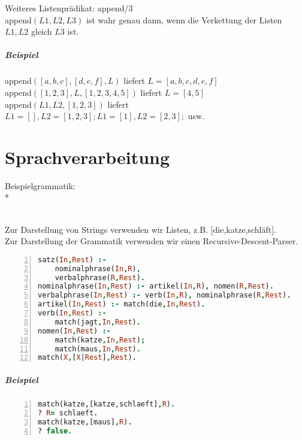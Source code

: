 \documentclass[a4paper]{scrartcl}
\begin{document}
Weiteres Listenprädikat: append$/$3\\
append$(L1,L2,L3)$ ist wahr genau dann, wenn die Verkettung der Listen $L1,L2$ gleich $L3$ ist.
\subparagraph{Beispiel} append$([a,b,c],[d,e,f],L)$ liefert $L=[a,b,c,d,e,f]$\\
append$([1,2,3],L,[1,2,3,4,5])$ liefert $L=[4,5]$\\
append$(L1,L2,[1,2,3])$ liefert $L1 = [], L2=[1,2,3]; L1=[1], L2=[2,3];$ usw.

\section{Sprachverarbeitung}
Beispielgrammatik:\\*
\\
Zur Darstellung von Strings verwenden wir Listen, z.B. $[$die,katze,schläft$]$.\\
Zur Darstellung der Grammatik verwenden wir einen Recursive-Descent-Parser.\\
\begin{lstlisting}[numbers=left, tabsize=4, language=Prolog]
satz(In,Rest) :-
    nominalphrase(In,R),
    verbalphrase(R,Rest).
nominalphrase(In,Rest) :- artikel(In,R), nomen(R,Rest).
verbalphrase(In,Rest) :- verb(In,R), nominalphrase(R,Rest).
artikel(In,Rest) :- match(die,In,Rest).
verb(In,Rest) :- 
    match(jagt,In,Rest).
nomen(In,Rest) :-
    match(katze,In,Rest);
    match(maus,In,Rest).
match(X,[X|Rest],Rest).
\end{lstlisting}
\subparagraph{Beispiel}
\begin{lstlisting}[numbers=left, tabsize=4, language=Prolog]
match(katze,[katze,schlaeft],R).
? R= schlaeft.
match(katze,[maus],R).
? false.
\end{lstlisting}
\end{document}
